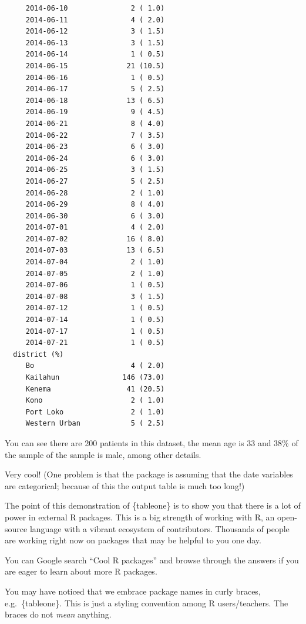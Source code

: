 \documentclass[
  letterpaper,
  DIV=11,
  numbers=noendperiod]{scrreprt}
\begin{document}
\begin{verbatim}
     2014-06-10               2 ( 1.0) 
     2014-06-11               4 ( 2.0) 
     2014-06-12               3 ( 1.5) 
     2014-06-13               3 ( 1.5) 
     2014-06-14               1 ( 0.5) 
     2014-06-15              21 (10.5) 
     2014-06-16               1 ( 0.5) 
     2014-06-17               5 ( 2.5) 
     2014-06-18              13 ( 6.5) 
     2014-06-19               9 ( 4.5) 
     2014-06-21               8 ( 4.0) 
     2014-06-22               7 ( 3.5) 
     2014-06-23               6 ( 3.0) 
     2014-06-24               6 ( 3.0) 
     2014-06-25               3 ( 1.5) 
     2014-06-27               5 ( 2.5) 
     2014-06-28               2 ( 1.0) 
     2014-06-29               8 ( 4.0) 
     2014-06-30               6 ( 3.0) 
     2014-07-01               4 ( 2.0) 
     2014-07-02              16 ( 8.0) 
     2014-07-03              13 ( 6.5) 
     2014-07-04               2 ( 1.0) 
     2014-07-05               2 ( 1.0) 
     2014-07-06               1 ( 0.5) 
     2014-07-08               3 ( 1.5) 
     2014-07-12               1 ( 0.5) 
     2014-07-14               1 ( 0.5) 
     2014-07-17               1 ( 0.5) 
     2014-07-21               1 ( 0.5) 
  district (%)                         
     Bo                       4 ( 2.0) 
     Kailahun               146 (73.0) 
     Kenema                  41 (20.5) 
     Kono                     2 ( 1.0) 
     Port Loko                2 ( 1.0) 
     Western Urban            5 ( 2.5) 
\end{verbatim}

You can see there are 200 patients in this dataset, the mean age is 33
and 38\% of the sample of the sample is male, among other details.

Very cool! (One problem is that the package is assuming that the date
variables are categorical; because of this the output table is much too
long!)

The point of this demonstration of \{tableone\} is to show you that
there is a lot of power in external R packages. This is a big strength
of working with R, an open-source language with a vibrant ecosystem of
contributors. Thousands of people are working right now on packages that
may be helpful to you one day.

You can Google search ``Cool R packages'' and browse through the answers
if you are eager to learn about more R packages.

\begin{tcolorbox}[enhanced jigsaw, colframe=quarto-callout-note-color-frame, rightrule=.15mm, opacityback=0, breakable, coltitle=black, colbacktitle=quarto-callout-note-color!10!white, bottomrule=.15mm, leftrule=.75mm, toprule=.15mm, arc=.35mm, bottomtitle=1mm, colback=white, left=2mm, opacitybacktitle=0.6, titlerule=0mm, title=\textcolor{quarto-callout-note-color}{\faInfo}\hspace{0.5em}{Side Note}, toptitle=1mm]

You may have noticed that we embrace package names in curly braces,
e.g.~\{tableone\}. This is just a styling convention among R
users/teachers. The braces do not \emph{mean} anything.

\end{tcolorbox}
\end{document}
